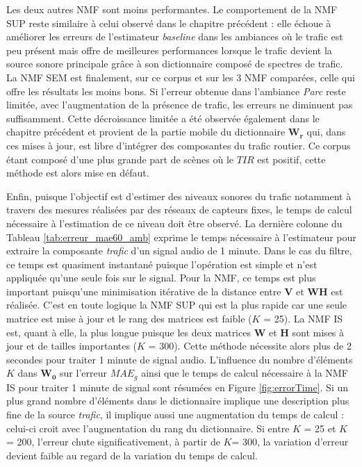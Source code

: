 Les deux autres NMF sont moins performantes.
Le comportement de la NMF SUP reste similaire à celui observé dans le chapitre précédent : elle échoue à améliorer les erreurs de l'estimateur \textit{baseline} dans les ambiances où le trafic est peu présent mais offre de meilleures performances lorsque le trafic devient la source sonore principale grâce à son dictionnaire composé de spectres de trafic.
La NMF SEM est finalement, sur ce corpus et sur les 3 NMF comparées, celle qui offre les résultats les moins bons. Si l'erreur obtenue dans l'ambiance \textit{Parc} reste limitée, avec l'augmentation de la présence de trafic, les erreurs ne diminuent pas suffisamment. Cette décroissance limitée a été observée également dans le chapitre précédent et provient de la partie mobile du dictionnaire $\mathbf{W_r}$ qui, dans ces mises à jour, est libre d'intégrer des composantes du trafic routier. Ce corpus étant composé d'une plus grande part de scènes où le $TIR$ est positif, cette méthode est alors mise en défaut. 

Enfin, puisque l'objectif est d'estimer des niveaux sonores du trafic notamment à travers des mesures réalisées par des réseaux de capteurs fixes, le temps de calcul nécessaire à l'estimation de ce niveau doit être observé. La dernière colonne du Tableau \ref{tab:erreur_mae60_amb} exprime le temps nécessaire à l'estimateur pour extraire la composante \textit{trafic} d'un signal audio de 1 minute. Dans le cas du filtre, ce temps est quasiment instantané puisque l'opération est simple et n'est appliquée qu'une seule fois sur le signal.
Pour la NMF, ce temps est plus important puisqu'une minimisation itérative de la distance entre $\mathbf{V}$ et $\mathbf{WH}$ est réalisée. C'est en toute logique la NMF SUP qui est la plus rapide car une seule matrice est mise à jour et le rang des matrices est faible ($K$ = 25).
La NMF IS est, quant à elle, la plus longue puisque les deux matrices $\mathbf{W}$ et $\mathbf{H}$ sont mises à jour et de tailles importantes ($K$ = 300). Cette méthode nécessite alors plus de 2 secondes pour traiter 1 minute de signal audio. L'influence du nombre d'éléments $K$ dans $\mathbf{W_0}$ sur l'erreur $MAE_g$ ainsi que le temps de calcul nécessaire à la NMF IS pour traiter 1 minute de signal sont résumées en Figure \ref{fig:errorTime}. Si un plus grand nombre d'éléments dans le dictionnaire implique une description plus fine de la source \textit{trafic}, il implique aussi une augmentation du temps de calcul : celui-ci croit avec l'augmentation du rang du dictionnaire. Si entre $K$ = 25 et $K$ = 200, l'erreur chute significativement, à partir de $K$= 300, la variation d'erreur devient faible au regard de la variation du temps de calcul. 

